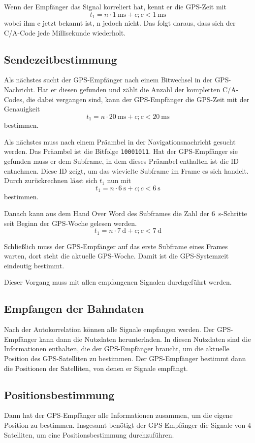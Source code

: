 \documentclass[12pt,a4paper]{scrartcl}
\begin{document}
Wenn der Empfänger das Signal korreliert hat, kennt er die GPS-Zeit mit $$t_1 = n\cdot\SI{1}{\milli\second} + c; c<\SI{1}{\milli\second}$$ wobei ihm c jetzt bekannt ist, n jedoch nicht. Das folgt daraus, dass sich der C/A-Code jede Millisekunde wiederholt.

\subsection{Sendezeitbestimmung}
Als nächstes sucht der GPS-Empfänger nach einem Bitwechsel in der GPS-Nachricht. Hat er diesen gefunden und zählt die Anzahl der kompletten C/A-Codes, die dabei vergangen sind, kann der GPS-Empfänger die GPS-Zeit mit der Genauigkeit  $$t_1 = n\cdot\SI{20}{\milli\second} + c; c<\SI{20}{\milli\second}$$ bestimmen.

Als nächstes muss nach einem Präambel in der Navigationsnachricht gesucht werden. Das Präambel ist die Bitfolge \texttt{10001011}. Hat der GPS-Empfänger sie gefunden muss er dem Subframe, in dem dieses Präambel enthalten ist die ID entnehmen. Diese ID zeigt, um das wievielte Subframe im Frame es sich handelt. Durch zurückrechnen lässt sich $t_1$ nun mit $$t_1 = n\cdot\SI{6}{\second} + c; c<\SI{6}{\second}$$ bestimmen.

Danach kann aus dem Hand Over Word des Subframes die Zahl der \SI{6}{\second}-Schritte seit Beginn der GPS-Woche gelesen werden. $$t_1 = n\cdot\SI{7}{\day} + c; c<\SI{7}{\day}$$

Schließlich muss der GPS-Empfänger auf das erste Subframe eines Frames warten, dort steht die aktuelle GPS-Woche. Damit ist die GPS-Systemzeit eindeutig bestimmt.

Dieser Vorgang muss mit allen empfangenen Signalen durchgeführt werden.

\subsection{Empfangen der Bahndaten}
Nach der Autokorrelation können alle Signale empfangen werden. Der GPS-Empfänger kann dann die Nutzdaten herunterladen. In diesen Nutzdaten sind die Informationen enthalten, die der GPS-Empfänger braucht, um die aktuelle Position des GPS-Satelliten zu bestimmen. Der GPS-Empfänger bestimmt dann die Positionen der Satelliten, von denen er Signale empfängt.

\subsection{Positionsbestimmung}
Dann hat der GPS-Empfänger alle Informationen zusammen, um die eigene Position zu bestimmen. Insgesamt benötigt der GPS-Empfänger die Signale von 4 Satelliten, um eine Positionsbestimmung durchzuführen.
\end{document}
